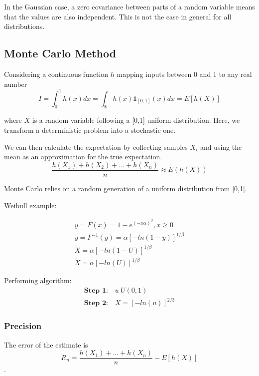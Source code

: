 \documentclass[11pt]{article}
\begin{document}
In the Gaussian case, a zero covariance between parts of a random variable means that the values are also independent.
This is not the case in general for all distributions. 

\subsection{Monte Carlo Method}
Considering a continuous function $h$ mapping inputs between 0 and 1 to any real number
\begin{equation}
    I = \int_{0}^{1} h(x) dx = \int_{\mathbb{R}} h(x) \textbf{1}_{[0,1]}(x) dx = E[h(X)]
\end{equation}

where $X$ is a random variable following a [0,1] uniform distribution.
Here, we transform a deterministic problem into a stochastic one.

We can then calculate the expectation by collecting samples $X_i$ and using the mean as an approximation for the true expectation.
\begin{equation}
    \frac{h(X_1) + h(X_2) + \dots + h(X_n)}{n} \approx E(h(X))
\end{equation}

Monte Carlo relies on a random generation of a uniform distribution from [0,1].

Weibull example:

\begin{gather}
    y = F(x) = 1 - e^{(-x\alpha)^\beta}, x \geq 0 \\
    y = F^{-1} (y) = \alpha[-ln(1-y)]^{1/ \beta} \\
    \tilde{X} = \alpha [-ln(1-U)]^{1 / \beta} \\
    \tilde{X} = \alpha [-ln(U)]^{1 / \beta}
\end{gather}

Performing algorithm:
\begin{gather}
    \textbf{Step 1:} \quad u ~ U(0,1) \\
    \textbf{Step 2:} \quad X = [-ln(u)]^{2/3}
\end{gather}

\subsubsection{Precision}
The error of the estimate is 
\begin{equation}
    R_n = \frac{h(X_1) + \dots + h(X_n)}{n} - E[h(X)]
\end{equation}.
\end{document}
